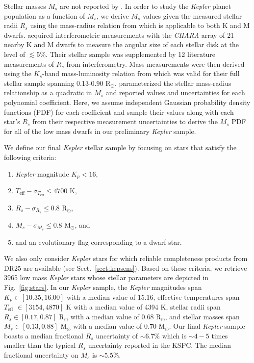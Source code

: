 \documentclass[twocolumn]{emulateapj}
\newcommand{\kepler}[1]{\emph{Kepler}#1}
\newcommand{\teff}[1]{$T_{\text{eff}}$#1}
\begin{document}
Stellar masses $M_s$ are not reported by \cite{berger18}. In order to study the \kepler{} planet population as a function of $M_s$,
we derive $M_s$ values given the measured stellar radii $R_s$ using the mass-radius relation from \cite{boyajian12} which is
applicable to both K and M dwarfs.
\cite{boyajian12} acquired interferometric measurements with the \emph{CHARA} array of 21 nearby K and M dwarfs
to measure the angular size of each stellar disk at the level of $\lesssim 5$\%. Their stellar sample was supplemented by 12
literature measurements of $R_s$ from interferometry. Mass measurements were then derived using the $K_s$-band mass-luminosity
relation from \cite{henry93} which was valid for their full stellar sample spanning 0.13-0.90 R$_{\odot}$. \cite{boyajian12}
parameterized the stellar mass-radius relationship as a quadratic in $M_s$ and reported values and uncertainties for each polynomial
coefficient. Here, we assume independent Gaussian probability density functions (PDF) for each coefficient and sample their values
along with each star's $R_s$ from their respective measurement uncertainties to derive the $M_s$ PDF for all of the low mass dwarfs
in our preliminary \kepler{} sample.

We define our final \kepler{} stellar sample by focusing on stars that satisfy the following criteria:

\begin{enumerate}
\item \kepler{} magnitude $K_p < 16$,
\item $T_{\text{eff}} - \sigma_{T_{\text{eff}}} \leq 4700$ K,
\item $R_s - \sigma_{R_s} \leq 0.8$ R$_{\odot}$,
\item $M_s - \sigma_{M_s} \leq 0.8$ M$_{\odot}$, and
\item and an evolutionary flag corresponding to a dwarf star. 
\end{enumerate}

\noindent We also only consider \kepler{} stars for which reliable completeness products from DR25
are available (see Sect.~\ref{sect:kepsens}). Based on these criteria, we retrieve 3965 low mass \kepler{}
stars whose stellar parameters are depicted in Fig.~\ref{fig:stars}.
In our \kepler{} sample, the \kepler{} magnitudes span $K_p \in [10.35, 16.00]$ with a median value of 15.16,
effective temperatures span \teff{} $\in [3154, 4870]$ K with a median value of 4394 K,
stellar radii span $R_s \in [0.17, 0.87]$ R$_{\odot}$ with a median value of 0.68 R$_{\odot}$, and
stellar masses span $M_s \in [0.13, 0.88]$ M$_{\odot}$ with a median value of 0.70 M$_{\odot}$.
Our final \kepler{} sample boasts a median fractional $R_s$ uncertainty of $\sim 6.7$\% which is $\sim 4-5$
times smaller than the typical $R_s$ uncertainty reported in the KSPC. The median fractional uncertainty on
$M_s$ is $\sim 5.5$\%.
\end{document}
